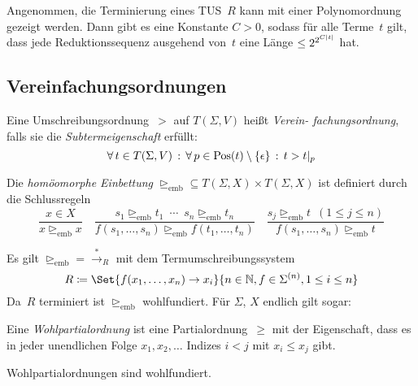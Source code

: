 \documentclass{cheat-sheet}
\newcommand{\reducesTo}{\xrightarrow{*}}
\DeclareMathOperator{\Pos}{Pos} %
\newcommand{\size}[1]{\abs{{#1}}} %
\newcommand{\inferrule}[2]{\frac{{#1}}{{#2}}} %
\newcommand{\emb}{\trianglerighteq_\text{emb}} %
\begin{document}

\begin{prop}
  Angenommen, die Terminierung eines TUS~$R$ kann mit einer Polynomordnung gezeigt werden.
  Dann gibt es eine Konstante $C > 0$, sodass für alle Terme~$t$ gilt, dass jede Reduktionssequenz ausgehend von~$t$ eine Länge $\leq 2^{2^{C \size{t}}}$ hat.
\end{prop}

\subsection{Vereinfachungsordnungen}

\begin{defn}
  Eine Umschreibungsordnung~$>$ auf $T(\Sigma, V)$ heißt \emph{Verein- fachungsordnung}, falls sie die \emph{Subtermeigenschaft} erfüllt:
  \[
    \fa{t \in T(\Sigma, V)} \fa{p \in \Pos(t) \setminus \{ \epsilon \}} t > t|_p
  \]
\end{defn}

\begin{defn}
  Die \emph{homöomorphe Einbettung} ${\emb} \subseteq T(\Sigma, X) \times T(\Sigma, X)$ ist definiert durch die Schlussregeln
  \[
    \inferrule
      {x \in X}
      {x \emb x} \quad
    \inferrule
      {s_1 \emb t_1 \enspace \cdots \enspace s_n \emb t_n}
      {f(s_1, \ldots, s_n) \emb f(t_1, \ldots, t_n)} \quad
    \inferrule
      {s_j \emb t \enspace (1 \leq j \leq n)}
      {f(s_1, \ldots, s_n) \emb t}
  \]
\end{defn}

\begin{bem}
  Es gilt ${\emb} = {\reducesTo}_R$ mit dem Termumschreibungssystem
  \[
    R \coloneqq \Set{f(x_1, \ldots, x_n) \to x_i}{n \in \N, f \in \Sigma^{(n)}, 1 \leq i \leq n}
  \]
  Da~$R$ terminiert ist ${\emb}$ wohlfundiert.
  Für $\Sigma$, $X$ endlich gilt sogar:
\end{bem}

\begin{lem}
  Eine \emph{Wohlpartialordnung} ist eine Partialordnung~$\geq$ mit der Eigenschaft, dass es in jeder unendlichen Folge $x_1, x_2, \ldots$ Indizes $i < j$ mit $x_i \leq x_j$ gibt.
\end{lem}

\begin{bem}
  Wohlpartialordnungen sind wohlfundiert.
\end{bem}
\end{document}
